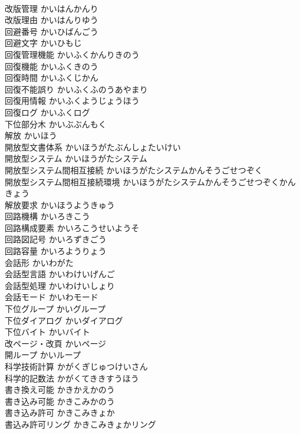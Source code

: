 \documentclass[8pt]{extreport}
\begin{document}
\begin{CJK}{UTF8}{min}
\\	改版管理	かいはんかんり	
\\	改版理由	かいはんりゆう	
\\	回避番号	かいひばんごう	
\\	回避文字	かいひもじ	
\\	回復管理機能	かいふくかんりきのう	
\\	回復機能	かいふくきのう	
\\	回復時間	かいふくじかん	
\\	回復不能誤り	かいふくふのうあやまり	
\\	回復用情報	かいふくようじょうほう	
\\	回復ログ	かいふくログ	
\\	下位部分木	かいぶぶんもく	
\\	解放	かいほう	
\\	開放型文書体系	かいほうがたぶんしょたいけい	
\\	開放型システム	かいほうがたシステム	
\\	開放型システム間相互接続	かいほうがたシステムかんそうごせつぞく	
\\	開放型システム間相互接続環境	かいほうがたシステムかんそうごせつぞくかんきょう	
\\	解放要求	かいほうようきゅう	
\\	回路機構	かいろきこう	
\\	回路構成要素	かいろこうせいようそ	
\\	回路図記号	かいろずきごう	
\\	回路容量	かいろようりょう	
\\	会話形	かいわがた	
\\	会話型言語	かいわけいげんご	
\\	会話型処理	かいわけいしょり	
\\	会話モード	かいわモード	
\\	下位グループ	かいグループ	
\\	下位ダイアログ	かいダイアログ	
\\	下位バイト	かいバイト	
\\	改ページ・改頁	かいページ	
\\	開ループ	かいループ	
\\	科学技術計算	かがくぎじゅつけいさん	
\\	科学的記数法	かがくてききすうほう	
\\	書き換え可能	かきかえかのう	
\\	書き込み可能	かきこみかのう	
\\	書き込み許可	かきこみきょか	
\\	書込み許可リング	かきこみきょかリング	

\end{CJK}
\end{document}
